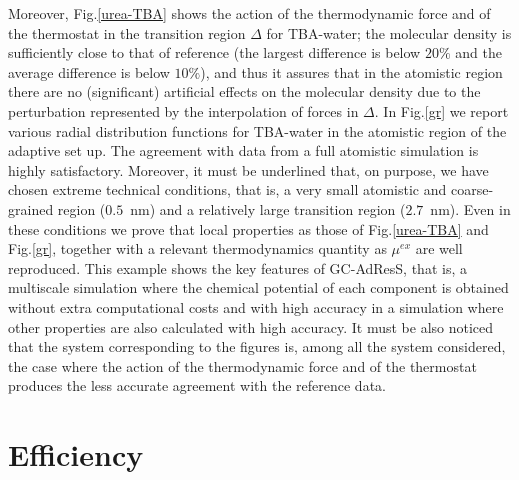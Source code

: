 \documentclass[a4paper,preprint,unsortedaddress]{revtex4-1}
\begin{document}
Moreover, Fig.\ref{urea-TBA} shows the action of the thermodynamic force and of the thermostat in the transition region $\Delta$ for TBA-water; the molecular density is sufficiently close to that of reference (the largest difference is below $20\%$ and the average difference is below $10\%$), and thus it assures that in the atomistic region there are no (significant) artificial effects on the molecular density due to the perturbation represented by the interpolation of forces in $\Delta$. In Fig.\ref{gr} we report various radial distribution functions for TBA-water in the atomistic region of the adaptive set up. The agreement with data from a full atomistic simulation is highly satisfactory. Moreover, it must be underlined that, on purpose, we have chosen extreme technical conditions, that is, a very small atomistic and coarse-grained region ($0.5$~nm) and a relatively large transition region ($2.7$~nm). Even in these conditions we prove that local properties as those of Fig.\ref{urea-TBA} and Fig.\ref{gr}, together with a relevant thermodynamics quantity as $\mu^{ex}$ are well reproduced.
This example shows the key features of GC-AdResS, that is, a multiscale simulation where the chemical potential of each component is obtained without extra computational costs and with high accuracy in a simulation where other properties are also calculated with high accuracy. It must be also noticed that the system corresponding to the figures is, among all the system considered, the case where the action of the thermodynamic force and of the thermostat produces the less accurate agreement with the reference data.

\section{Efficiency}
\end{document}
